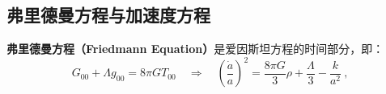 \subsection{弗里德曼方程与加速度方程}

\textbf{弗里德曼方程（Friedmann Equation）}是爱因斯坦方程的时间部分，即：
\begin{equation}G_{00}+\Lambda g_{00}=8\pi GT_{00}\quad\Rightarrow\quad\left(\frac{\dot{a}}{a}\right)^2=\frac{8\pi G}{3}\rho+\frac{\Lambda}{3}-\frac{k}{a^2}~,\end{equation}